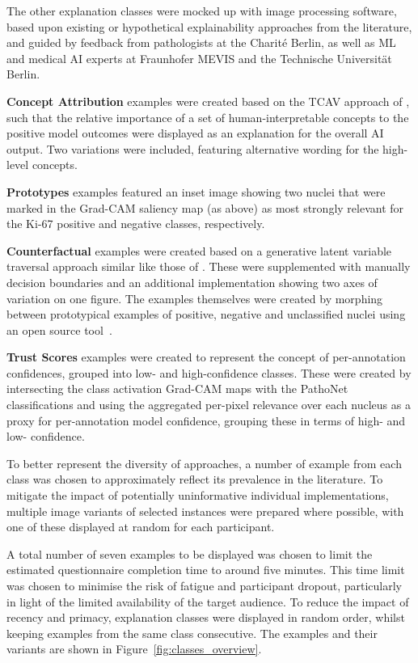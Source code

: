 \documentclass[final,5p,times,twocolumn,hyphens]{elsarticle}
\begin{document}
The other explanation classes were mocked up with image processing software, based upon existing or hypothetical explainability approaches from the literature, and guided by feedback from pathologists at the Charité Berlin, as well as ML and medical AI experts at Fraunhofer MEVIS and the Technische Universität Berlin.

\textbf{Concept Attribution} examples were created based on the TCAV approach of \citet{kim2018interpretability}, such that the relative importance of a set of human-interpretable concepts to the positive model outcomes were displayed as an explanation for the overall AI output. Two variations were included, featuring alternative wording for the high-level concepts. 

\textbf{Prototypes} examples featured an inset image showing two nuclei that were marked in the Grad-CAM saliency map (as above) as most strongly relevant for the Ki-67 positive and negative classes, respectively.

\textbf{Counterfactual} examples were created based on a generative latent variable traversal approach similar like those of \citet{liu2019generative}. These were supplemented with manually decision boundaries and an additional implementation showing two axes of variation on one figure. The examples themselves were created by morphing between prototypical examples of positive, negative and unclassified nuclei using an open source tool~\cite{diffmorph:github}.

\textbf{Trust Scores} examples were created to represent the concept of per-annotation confidences, grouped into low- and high-confidence classes. These were created by intersecting the class activation Grad-CAM maps with the PathoNet classifications and using the aggregated per-pixel relevance over each nucleus as a proxy for per-annotation model confidence, grouping these in terms of high- and low- confidence.

To better represent the diversity of approaches, a number of example from each class was chosen to approximately reflect its prevalence in the literature. To mitigate the impact of potentially uninformative individual implementations, multiple image variants of selected instances were prepared where possible, with one of these displayed at random for each participant. 

A total number of seven examples to be displayed was chosen to limit the estimated questionnaire completion time to around five minutes. This time limit was chosen to minimise the risk of fatigue and participant dropout, particularly in light of the limited availability of the target audience. To reduce the impact of recency and primacy, explanation classes were displayed in random order, whilst keeping examples from the same class consecutive. The examples and their variants are shown in Figure~\ref{fig:classes_overview}.
\end{document}
